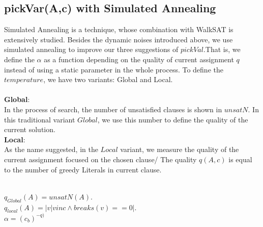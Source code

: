 \documentclass[12pt,a4paper,twoside]{scrartcl}
\numberwithin{equation}{section}
\begin{document}
\subsection{pickVar(A,c) with Simulated Annealing}
Simulated Annealing is a technique, whose combination with WalkSAT is extensively studied. Besides the dynamic noises introduced above, we use simulated annealing to improve our three suggestions of $pickVal$.That is, we define the $\alpha$ as a function depending on the quality of current assignment $q$ instead of using a static parameter in the whole process.
To define the $temperature$, we have two variants: Global and Local.\\
\\
\textbf{Global}:\\
In the process of search, the number of unsatisfied clauses is shown in $unsatN$. In this traditional variant $Global$, we use this number to define the quality of the current solution.\\
\textbf{Local}:\\
As the name suggested, in the $Local$ variant, we measure the quality of the current assignment focused on the chosen clause/ The quality  $q(A,c)$ is equal to the number of greedy Literals in current clause.\\
\\
\begin{center}
 $q_{Global}(A) =unsatN(A)$.\\
 $q_{local}(A) =|{v| v in  c \land breaks(v) == 0}|$.\\
 $\alpha = (c_b)^{-q)}$\\
\end{center}


\label{sec:Simulated Annealing}
\end{document}
